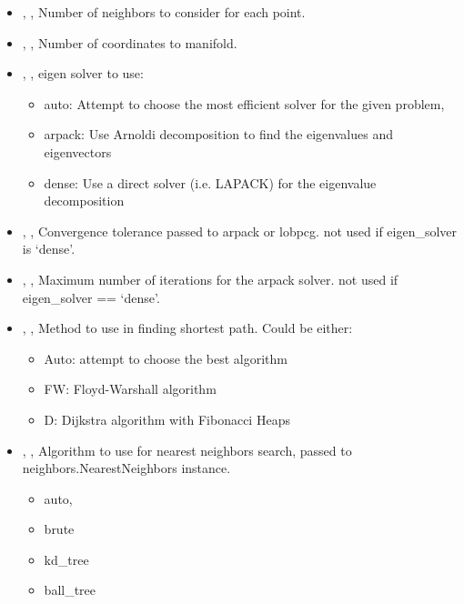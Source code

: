 \begin{itemize}
	\item {}, , Number of neighbors to
	consider for each point. 
	\item {}, , Number of coordinates to
	manifold. 
	\item {}, , eigen solver to use:
	\begin{itemize}
		\item auto: Attempt to choose the most efficient solver for the given problem,
		\item arpack: Use Arnoldi decomposition to find the eigenvalues and eigenvectors
		\item dense: Use a direct solver (i.e. LAPACK) for the eigenvalue decomposition
	\end{itemize}
	\item {}, , Convergence tolerance passed to
	arpack or lobpcg. not used if eigen\_solver is ‘dense’. 
	\item {}, , Maximum number of iterations
	for the arpack solver. not used if eigen\_solver == ‘dense’. 
	\item {}, , Method to use in finding
	 shortest path. Could be either:
	\begin{itemize}
		\item Auto: attempt to choose the best algorithm
		\item FW: Floyd-Warshall algorithm
		\item D: Dijkstra algorithm with Fibonacci Heaps
	\end{itemize}
	\item {}, , Algorithm to use
	 for nearest neighbors search, passed to neighbors.NearestNeighbors instance.
	\begin{itemize}
		\item auto,
		\item brute
		\item kd\_tree
		\item ball\_tree
	\end{itemize}
\end{itemize}


